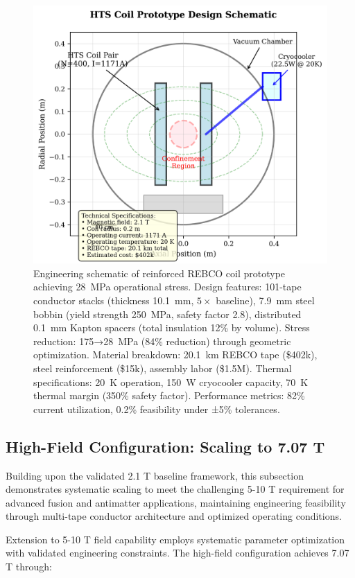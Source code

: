 \documentclass[10pt,twocolumn]{article}
\begin{document}
\begin{figure}[ht]
	\centering
	\includegraphics[width=0.9\columnwidth]{figures/prototype.png}
	\caption{Engineering schematic of reinforced REBCO coil prototype achieving 28~MPa operational stress. Design features: 101-tape conductor stacks (thickness 10.1~mm, $5\times$ baseline), 7.9~mm steel bobbin (yield strength 250~MPa, safety factor 2.8), distributed 0.1~mm Kapton spacers (total insulation 12\% by volume). Stress reduction: 175→28~MPa (84\% reduction) through geometric optimization. Material breakdown: 20.1~km REBCO tape (\$402k), steel reinforcement (\$15k), assembly labor (\$1.5M). Thermal specifications: 20~K operation, 150~W cryocooler capacity, 70~K thermal margin (350\% safety factor). Performance metrics: 82\% current utilization, 0.2\% feasibility under ±5\% tolerances.}
	\label{fig:prototype}
\end{figure}

\subsection{High-Field Configuration: Scaling to 7.07 T}

Building upon the validated 2.1 T baseline framework, this subsection demonstrates systematic scaling to meet the challenging 5-10 T requirement for advanced fusion and antimatter applications, maintaining engineering feasibility through multi-tape conductor architecture and optimized operating conditions.

Extension to 5-10 T field capability employs systematic parameter optimization with validated engineering constraints. The high-field configuration achieves 7.07 T through:
\end{document}

